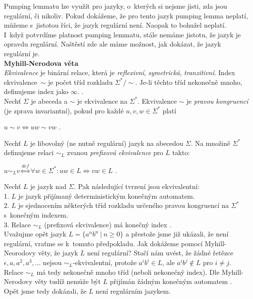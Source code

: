 Pumping lemmatu lze využít pro jazyky, o~kterých si nejsme jisti, zda jsou regulární, či nikoliv. Pokud dokážeme, že pro tento jazyk pumping lemma 
neplatí, můžeme s~jistotou říci, že jazyk regulární není. Naopak to bohužel neplatí. 
I~když potvrdíme platnost pumping lemmatu, stále nemáme jistotu, že jazyk je opravdu regulární. Naštěstí zde ale máme možnost, jak dokázat, že 
jazyk regulární je. \\

\textbf{Myhill-Nerodova věta} \\
\textit{Ekvivalence} je binární relace, která je \textit{reflexivní}, \textit{symetrická}, \textit{tranzitivní}.
Index \mbox{ekvivalence $\sim$} je počet tříd rozkladu $\Sigma^*/\sim$. Je-li těchto tříd nekonečně mnoho, definujeme index jako $\infty$.
\cite[str. 49]{TIN2013}. \\

Nechť $\Sigma$ je abeceda a $\sim$ je ekvivalence na $\Sigma^*$. Ekvivalence $\sim$ je \textit{pravou kongruencí} (je zprava invariantní), 
pokud pro každé $u, v, w \in \Sigma^*$ platí
\begin{center}
$u\sim v \Longleftrightarrow uw \sim vw$ \cite[str. 49]{TIN2013}.
\end{center} 
\vspace*{\baselineskip}
Nechť $L$ je libovolný (ne nutně regulární) jazyk na abecedou $\Sigma$. Na množině $\Sigma^*$ definujeme relaci 
$\sim_L$ zvanou \textit{prefixová ekvivalence} pro $L$ takto:
\begin{center}
$u\sim_L v \stackrel{def}{\Longleftrightarrow} \forall w \in \Sigma^*: uw \in L \Longleftrightarrow vw \in L$ \cite[str. 49]{TIN2013}.
\end{center} 
\vspace*{\baselineskip}
Nechť $L$ je jazyk nad $\Sigma$. Pak následující tvrzení jsou ekvivalentní: \\
1. $L$ je jazyk přijímaný deterministickým konečným automatem. \\
2. $L$ je sjednocením některých tříd rozkladu určeného pravou kongruencí na $\Sigma^*$ s~konečným indexem. \\
3. Relace $\sim_L$ (prefixová ekvivalence) má konečný index \cite[str. 49]{TIN2013}. \\

\Bat{} Uvažujme opět jazyk $L = \{a^nb^n \ | \ n \geq 0\}$ a přestože jsme již ukázali, že není regulární, vraťme se k~tomuto předpokladu. 
Jak dokážeme pomocí Myhill-Neorodovy věty, že jazyk $L$ není regulární? Stačí nám uvést, že žádné řetězce $\epsilon, a, a^2, a^3, \dots$ 
nejsou \mbox{$\sim_L$-ekvivalentní}, protože $a^ib^i \in L$, ale $a^ib^j \notin L$ pro $i \neq j$. Relace $\sim_L$ má tedy nekonečně mnoho 
tříd (neboli nekonečný index). Dle Myhill-Nerodovy věty tudíž nemůže být $L$ přijímán žádným konečným automatem \cite[str. 51]{TIN2013}. 
Opět jsme tedy dokázali, že  $L$ není regulárním jazykem. \\

